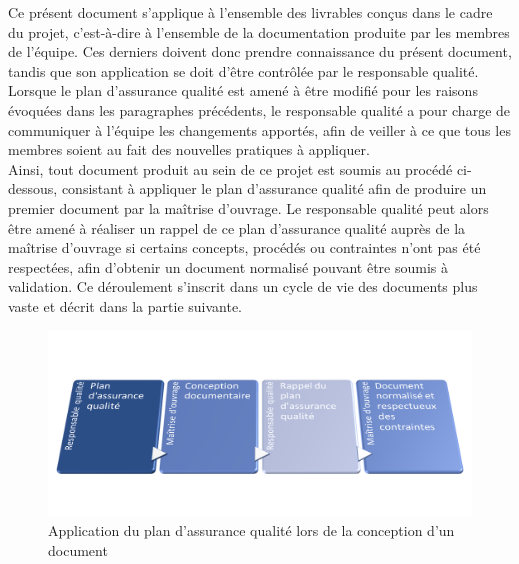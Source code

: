 Ce présent document s’applique à l’ensemble des livrables conçus dans le cadre du projet, c’est-à-dire à l’ensemble de la documentation produite par les membres de l’équipe. Ces derniers doivent donc prendre connaissance du présent document, tandis que son application se doit d’être contrôlée par le responsable qualité. Lorsque le plan d’assurance qualité est amené à être modifié pour les raisons évoquées dans les paragraphes précédents, le responsable qualité a pour charge de communiquer à l’équipe les changements apportés, afin de veiller à ce que tous les membres soient au fait des nouvelles pratiques à appliquer. \\

Ainsi, tout document produit au sein de ce projet est soumis au procédé ci-dessous, consistant à appliquer le plan d’assurance qualité afin de produire un premier document par la maîtrise d’ouvrage. Le responsable qualité peut alors être amené à réaliser un rappel de ce plan d’assurance qualité auprès de la maîtrise d’ouvrage si certains concepts, procédés ou contraintes n’ont pas été respectées, afin d’obtenir un document normalisé pouvant être soumis à validation. Ce déroulement s’inscrit dans un cycle de vie des documents plus vaste et décrit dans la partie suivante.

\begin{figure}[H]
    \centering
    \label{fig-objec}
    \includegraphics[scale=0.5]{figures/applic_paq.png}
    \caption{Application du plan d’assurance qualité lors de la conception d’un document}
\end{figure}
